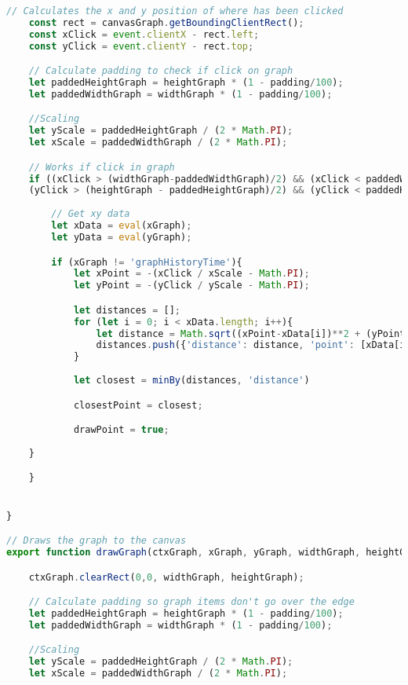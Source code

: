 \documentclass[12pt]{article}
\begin{document}
\begin{lstlisting}[language=JavaScript]
    // Calculates the x and y position of where has been clicked
    const rect = canvasGraph.getBoundingClientRect();
    const xClick = event.clientX - rect.left;
    const yClick = event.clientY - rect.top;

    // Calculate padding to check if click on graph
    let paddedHeightGraph = heightGraph * (1 - padding/100);
    let paddedWidthGraph = widthGraph * (1 - padding/100); 

    //Scaling
    let yScale = paddedHeightGraph / (2 * Math.PI);
    let xScale = paddedWidthGraph / (2 * Math.PI);

    // Works if click in graph
    if ((xClick > (widthGraph-paddedWidthGraph)/2) && (xClick < paddedWidthGraph + (widthGraph-paddedWidthGraph)/2) && 
    (yClick > (heightGraph - paddedHeightGraph)/2) && (yClick < paddedHeightGraph + (heightGraph-paddedHeightGraph)/2)){
            
        // Get xy data
        let xData = eval(xGraph);
        let yData = eval(yGraph);

        if (xGraph != 'graphHistoryTime'){
            let xPoint = -(xClick / xScale - Math.PI);
            let yPoint = -(yClick / yScale - Math.PI);

            let distances = [];
            for (let i = 0; i < xData.length; i++){
                let distance = Math.sqrt((xPoint-xData[i])**2 + (yPoint-yData[i])**2);
                distances.push({'distance': distance, 'point': [xData[i-1], yData[i-1]]});
            }
        
            let closest = minBy(distances, 'distance')

            closestPoint = closest;

            drawPoint = true;
            
    }

    }


}

// Draws the graph to the canvas
export function drawGraph(ctxGraph, xGraph, yGraph, widthGraph, heightGraph, pauseCheck) {

    ctxGraph.clearRect(0,0, widthGraph, heightGraph);

    // Calculate padding so graph items don't go over the edge
    let paddedHeightGraph = heightGraph * (1 - padding/100);
    let paddedWidthGraph = widthGraph * (1 - padding/100); 

    //Scaling
    let yScale = paddedHeightGraph / (2 * Math.PI);
    let xScale = paddedWidthGraph / (2 * Math.PI);


\end{lstlisting}
\end{document}
